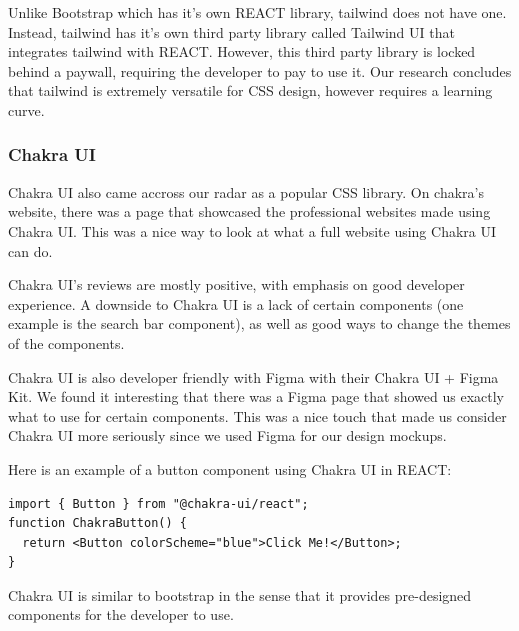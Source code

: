 \documentclass[12pt,titlepage]{article}
\begin{document}
Unlike Bootstrap which has it's own REACT library, tailwind does not have one.
Instead, tailwind has it's own third party library called Tailwind UI that integrates tailwind with REACT.
However, this third party library is locked behind a paywall, requiring the developer to pay to use it.
Our research concludes that tailwind is extremely versatile for CSS design, however requires a learning curve.

\subsubsection{Chakra UI}
Chakra UI also came accross our radar as a popular CSS library.
On chakra's website, there was a page that showcased the professional websites made using Chakra UI. 
This was a nice way to look at what a full website using Chakra UI can do.


Chakra UI's reviews are mostly positive, with emphasis on good developer experience.
A downside to Chakra UI is a lack of certain components (one example is the search bar component), as well
as good ways to change the themes of the components.

Chakra UI is also developer friendly with Figma with their Chakra UI + Figma Kit. 
We found it interesting that there was a Figma page that showed us exactly what to use for certain components.
This was a nice touch that made us consider Chakra UI more seriously since we used Figma for our design mockups.

Here is an example of a button component using Chakra UI in REACT:
\begin{verbatim}
import { Button } from "@chakra-ui/react";
function ChakraButton() {
  return <Button colorScheme="blue">Click Me!</Button>;
}
\end{verbatim}

Chakra UI is similar to bootstrap in the sense that it provides pre-designed components for the developer to use. 
\end{document}
